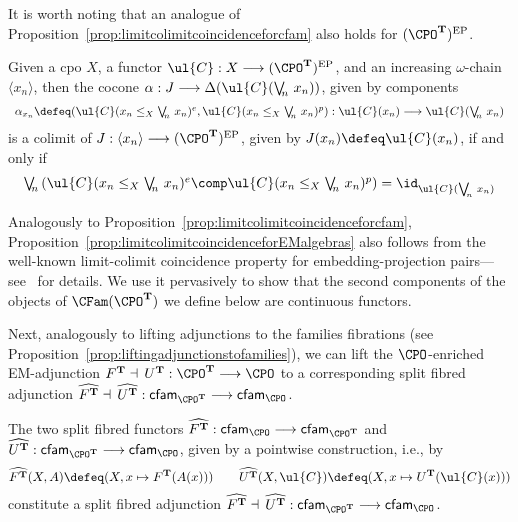 It is worth noting that an analogue of Proposition~\ref{prop:limitcolimitcoincidenceforcfam} also holds for $(\CPO^{\mathbf{T}})^{\text{EP}}$.

\begin{proposition}
\label{prop:limitcolimitcoincidenceforEMalgebras}
Given a cpo $X$, a functor $\ul{C} : X \longrightarrow (\CPO^{\mathbf{T}})^{\text{EP}}$, and an increasing $\omega$-chain $\langle x_n \rangle$, then the cocone $\alpha : J \longrightarrow \Delta(\ul{C}(\bigvee_{\!\!n}\, x_n))$, given by components 
\[
\begin{array}{c}
\alpha_{x_n} \defeq (\ul{C}(x_n \leq_X \bigvee_{\!\!n}\, x_n)^e , \ul{C}(x_n \leq_X \bigvee_{\!\!n}\, x_n)^p) : \ul{C}(x_n) \longrightarrow \ul{C}(\bigvee_{\!\!n}\, x_n)
\end{array}
\]
is a colimit of $J : \langle x_n \rangle \longrightarrow (\CPO^{\mathbf{T}})^{\text{EP}}$, given by $J(x_n) \defeq \ul{C}(x_n)$, if and only if 
\[
\begin{array}{c}
\bigvee_{\!\!n}\, (\ul{C}(x_n \leq_X \bigvee_{\!\!n}\, x_n)^e \comp \ul{C}(x_n \leq_X \bigvee_{\!\!n}\, x_n)^p) = \id_{\ul{C}(\bigvee_{\!\!n}\, x_n)} 
\end{array}
\]
\end{proposition}

Analogously to Proposition~\ref{prop:limitcolimitcoincidenceforcfam}, Proposition~\ref{prop:limitcolimitcoincidenceforEMalgebras} also follows from the well-known limit-colimit coincidence property for embed\-ding-projection pairs---see~\cite[Theorem~2]{Smyth:RecDomEqs} for details.
We use it pervasively to show that the second components of the objects of $\CFam(\CPO^{\mathbf{T}})$ we define below are continuous functors. 

Next, analogously to lifting adjunctions to the families fibrations (see Proposition~\ref{prop:liftingadjunctionstofamilies}), we can lift the $\CPO$-enriched EM-adjunction ${F^{\mathbf{T}} \dashv\, U^{\mathbf{T}} : \CPO^{\mathbf{T}} \longrightarrow \CPO}$ to a corresponding split fibred adjunction $\widehat{F^{\mathbf{T}}} \dashv\, \widehat{U^{\mathbf{T}}} : \mathsf{cfam}_{\CPO^{\mathbf{T}}} \longrightarrow \mathsf{cfam}_{\CPO}$.

\begin{proposition}
The two split fibred functors ${\widehat{F^{\mathbf{T}}} : \mathsf{cfam}_{\CPO} \longrightarrow \mathsf{cfam}_{\CPO^{\mathbf{T}}}}$ and \linebreak $\widehat{U^{\mathbf{T}}} : \mathsf{cfam}_{\CPO^{\mathbf{T}}} \longrightarrow \mathsf{cfam}_{\CPO}$, given by a pointwise construction, i.e., by
\[
\widehat{F^{\mathbf{T}}}(X,A) \defeq (X , x \mapsto F^{\mathbf{T}}(A(x)))
\qquad
\widehat{U^{\mathbf{T}}}(X,\ul{C}) \defeq (X , x \mapsto U^{\mathbf{T}}(\ul{C}(x)))
\]
constitute a split fibred adjunction $\widehat{F^{\mathbf{T}}} \dashv\, \widehat{U^{\mathbf{T}}} : \mathsf{cfam}_{\CPO^{\mathbf{T}}} \longrightarrow \mathsf{cfam}_{\CPO}$.
\end{proposition}

